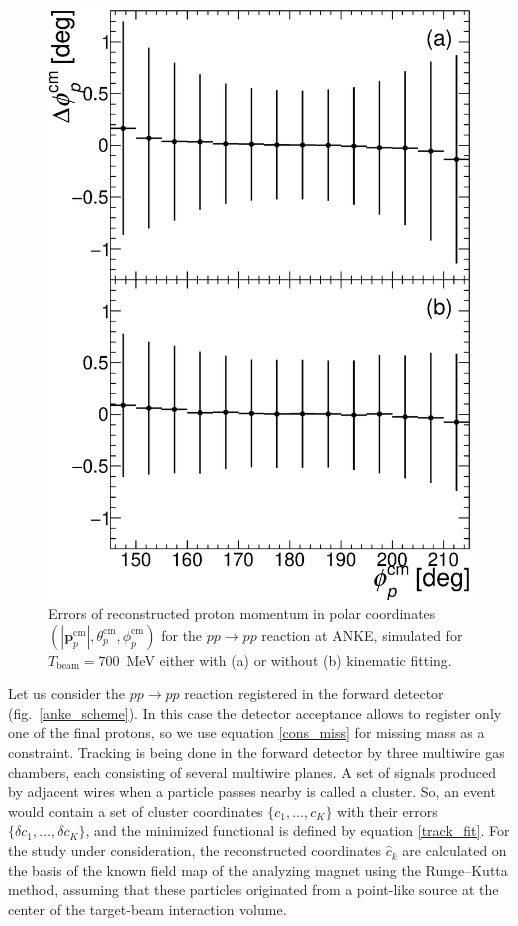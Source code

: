 \begin{figure}[htbp]
\includegraphics[height=0.3\textheight]{pics/drawPhi.eps}
\caption{
Errors of reconstructed proton momentum in polar coordinates $(|\boldsymbol{p}_p^\mathrm{cm}|, \theta_p^\mathrm{cm}, \phi_p^\mathrm{cm})$ for the $pp \to pp$ reaction at ANKE, simulated for $T_\mathrm{beam} = 700$~MeV either with (a) or without (b) kinematic fitting.
}
\label{anke_errs}
\end{figure}

Let us consider the $pp \to pp$ reaction registered in the forward detector (fig.~\ref{anke_scheme}).
In this case the detector acceptance allows to register only one of the final protons, so we use equation \eqref{cons_miss} for missing mass as a constraint.
Tracking is being done in the forward detector by three multiwire gas chambers, each consisting of several multiwire planes.
A set of signals produced by adjacent wires when a particle passes nearby is called a cluster.
So, an event would contain a set of cluster coordinates $\{c_1, \ldots, c_K\}$ with their errors $\{\delta c_1, \ldots, \delta c_K\}$, and the minimized functional is defined by equation \eqref{track_fit}.
For the study under consideration, the reconstructed coordinates $\hat{c}_k$ are calculated on the basis of the known field map of the analyzing magnet using the Runge–Kutta method, assuming that these particles originated from a point-like source at the center of the target-beam interaction volume.

